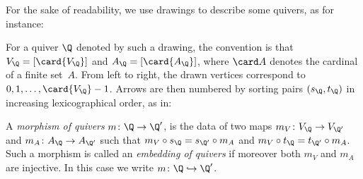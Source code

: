 For the sake of readability, we use drawings to describe some quivers, as for instance:
\begin{figure}[h]
\begin{center}
\end{center}
\end{figure}

For a quiver $\Q$ denoted by such a drawing, the convention is that $V_\Q = [\card{V_\Q}]$ and $A_\Q = [\card{A_\Q}]$, where $\card A$ denotes the cardinal of a finite set~$A$. From left to right, the drawn vertices correspond to $0, 1, \dots, \card{V_\Q}-1$. Arrows are then numbered by sorting pairs $(s_\Q, t_\Q)$ in increasing lexicographical order, as in:
\begin{figure}[h]
\begin{center}
\end{center}
\end{figure}

\begin{definition}
  A \emph{morphism of quivers} $m\colon \Q \to \Q'$, is the data of two maps $m_V\colon V_\Q \to V_{\Q'}$ and $m_A\colon A_\Q \to A_{\Q'}$ such that $m_V \circ s_\Q = s_{\Q'} \circ m_A$ and $m_V \circ t_\Q = t_{\Q'} \circ m_A$. Such a morphism is called an \emph{embedding of quivers} if moreover both $m_V$ and $m_A$ are injective. In this case we write $m\colon \Q \hookrightarrow \Q'$.
\end{definition}

